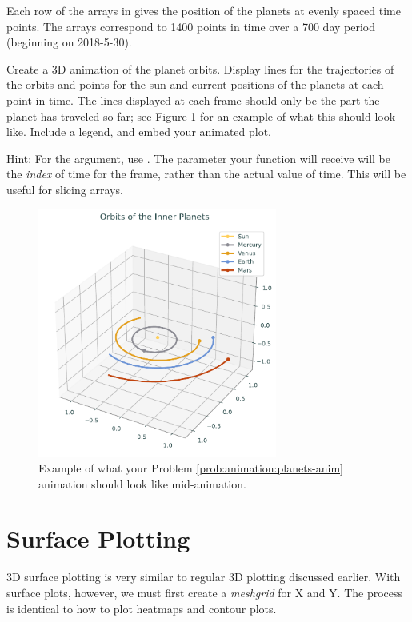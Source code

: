 \begin{problem}
\label{prob:animation:planets-anim}
Each row of the arrays in  gives the position of the planets at evenly spaced time points. The arrays correspond to 1400 points in time over a 700 day period (beginning on 2018-5-30).

Create a 3D animation of the planet orbits.
Display lines for the trajectories of the orbits and points for the sun and current positions of the planets at each point in time.
The lines displayed at each frame should only be the part the planet has traveled so far; see Figure \ref{animation:planets-midanimation} for an example of what this should look like.
Include a legend, and embed your animated plot.

Hint: For the  argument, use .
The parameter your  function will receive will be the \emph{index} of time for the frame, rather than the actual value of time.
This will be useful for slicing arrays.
\end{problem}
\begin{figure}[h]
\centering
\includegraphics[width=0.7\textwidth]{figures/orbits-midanimation.pdf}
\caption{Example of what your Problem \ref{prob:animation:planets-anim} animation should look like mid-animation.}
\label{animation:planets-midanimation}
\end{figure}

\section*{Surface Plotting}
3D surface plotting is very similar to regular 3D plotting discussed earlier.
With surface plots, however, we must first create a \textit{meshgrid} for X and Y.
The process is identical to how to plot heatmaps and contour plots.

